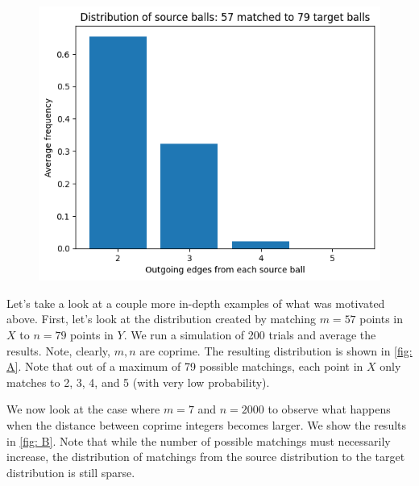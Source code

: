 \documentclass[12pt]{article}%
\theoremstyle{plain}
\begin{document}
\begin{figure}
  \centering
  \hspace*{0cm}\includegraphics[width=1\textwidth,height=\textwidth,keepaspectratio]{images/57-79.png}
  \caption{}
  \label{fig: A}
\end{figure}

Let's take a look at a couple more in-depth examples of what was motivated above. First, let's look at the distribution created by matching $m=57$ points in $X$ to $n=79$ points in $Y$. We run a simulation of 200 trials and average the results. Note, clearly, $m,n$ are coprime. The resulting distribution is shown in \eqref{fig: A}. Note that out of a maximum of 79 possible matchings, each point in $X$ only matches to 2, 3, 4, and 5 (with very low probability). 

We now look at the case where $m=7$ and $n=2000$ to observe what happens when the distance between coprime integers becomes larger. We show the results in \eqref{fig: B}. Note that while the number of possible matchings must necessarily increase, the distribution of matchings from the source distribution to the target distribution is still sparse.
\end{document}
